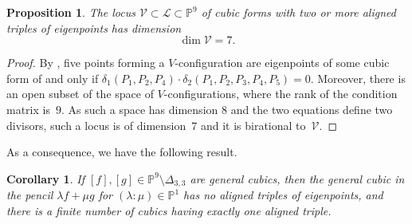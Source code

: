 \documentclass{amsart}
\theoremstyle{plain}
\newtheorem{prop}[lemma]{Proposition}
\newtheorem{corollary}[lemma]{Corollary}
\theoremstyle{definition}
\newtheorem{definition}[lemma]{Definition}
\newcommand{\p}{\mathbb{P}}
\newcommand{\sL}{\mathcal{L}}
\newcommand{\sV}{\mathcal{V}}
\begin{document}
\begin{prop}
    The locus $\sV \subset \sL \subset \p^9$ of cubic forms with two or more aligned triples of eigenpoints has dimension
    $$
    \dim \sV=7.
    $$
\end{prop}
\begin{proof}
   By , five points forming a $V$-configuration are eigenpoints of some cubic form of and only if $\delta_1 (P_1,P_2,P_4) \cdot
   \delta_2 (P_1,P_2,P_3,P_4,P_5)=0$. Moreover, there is an open subset of the space of $V$-configurations, where the rank of the condition matrix is~$9$. As such a space has dimension $8$ and the two equations define two divisors, such a locus is of dimension~$7$ and it is birational to~$\sV$.
\end{proof}
 As a consequence, we have the following result.
\begin{corollary}
\label{lemma:pencil_one_aligned}
 If $[f],[g] \in \p^9 \setminus \Delta_{3,3}$ are general cubics,
 then the general cubic in the pencil
 $\lambda f + \mu g$ for $(\lambda: \mu) \in \p^1$ has no aligned triples of eigenpoints, and there is a finite number of cubics having exactly one aligned triple.
\end{corollary}

%
\end{document}
